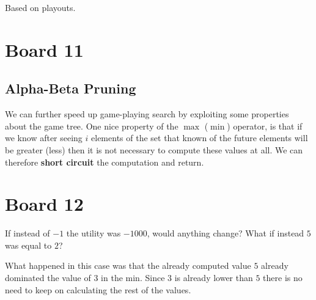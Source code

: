 \documentclass[10pt]{article}
\begin{document}
Based on playouts. 


\section{Board 11}

\subsection{Alpha-Beta Pruning}

We can further speed up game-playing search by exploiting some properties about the game tree.  One nice property of the $\max$ ($\min$) operator, is that if we know after seeing $i$ elements of the set that known of the future elements will be greater (less) then it is not necessary to compute these values at all. We can therefore \textbf{short circuit} the computation and return.


\section{Board 12}
  \begin{exercise}
    If instead of $-1$ the utility was $-1000$, would anything change? What if instead $5$ was equal to $2$?
  \end{exercise}








What happened in this case was that the already computed value $5$ already dominated the value of $3$ in the min. Since $3$ is already lower than $5$ there is no need to keep on calculating the rest of the values. 
\end{document}
